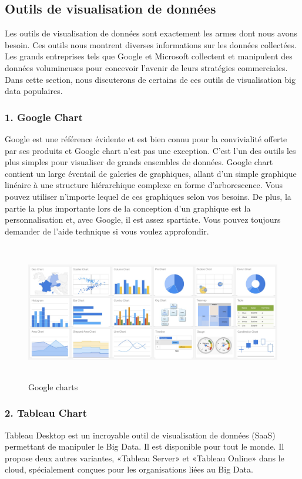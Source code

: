 \documentclass[french, a4paper, 12pt]{report}
\begin{document}
\subsection{Outils de visualisation de données }
Les outils de visualisation de données sont exactement les armes dont nous avons besoin. Ces outils nous montrent diverses informations sur les données collectées. Les grands entreprises tels que Google et Microsoft collectent et manipulent des données volumineuses pour concevoir l'avenir de leurs stratégies commerciales. Dans cette section, nous discuterons de certains de ces outils de visualisation big data populaires.\\

\subsubsection{1. Google Chart}
Google est une référence évidente et est bien connu pour la convivialité offerte par ses produits et Google chart n’est pas une exception. C'est l'un des outils les plus simples pour visualiser de grands ensembles de données. Google chart contient un large éventail de galeries de graphiques, allant d'un simple graphique linéaire à une structure hiérarchique complexe en forme d'arborescence. Vous pouvez utiliser n'importe lequel de ces graphiques selon vos besoins. De plus, la partie la plus importante lors de la conception d’un graphique est la personnalisation et, avec Google, il est assez spartiate. Vous pouvez toujours demander de l’aide technique si vous voulez approfondir.
\begin{figure}[!htp]
    \centering
    \includegraphics[height=6cm]{images/googlecharts.jpg}
    \caption{Google charts}
    \label{fig:2.16}
\end{figure}
\subsubsection{2. Tableau Chart}
Tableau Desktop est un incroyable outil de visualisation de données (SaaS) permettant de manipuler le Big Data. Il est disponible pour tout le monde. Il propose deux autres variantes, «Tableau Server» et «Tableau Online» dans le cloud, spécialement conçues pour les organisations liées au Big Data.
\end{document}
